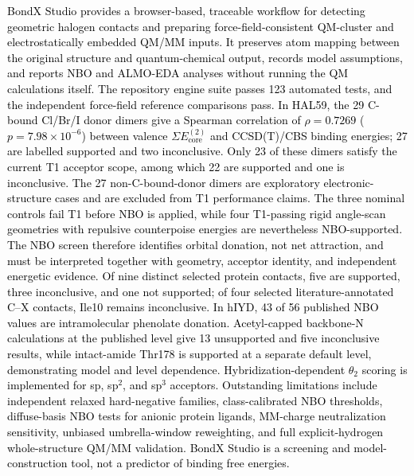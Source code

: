 \documentclass[journal=jcisd8,manuscript=article,layout=two-column]{achemso}
\newcommand{\tcb}[1]{{\textcolor{black}{#1}}}
\newcommand{\BX}{BondX Studio}
\begin{document}
\tcb{BondX Studio provides a browser-based, traceable workflow for detecting geometric halogen contacts and preparing force-field-consistent QM-cluster and electrostatically embedded QM/MM inputs. It preserves atom mapping between the original structure and quantum-chemical output, records model assumptions, and reports NBO and ALMO-EDA analyses without running the QM calculations itself. The repository engine suite passes 123 automated tests, and the independent force-field reference comparisons pass. In HAL59, the 29 C-bound Cl/Br/I donor dimers give a Spearman correlation of $\rho=0.7269$ ($p=7.98\times10^{-6}$) between valence $\Sigma E^{(2)}_{\mathrm{core}}$ and CCSD(T)/CBS binding energies; 27 are labelled supported and two inconclusive. Only 23 of these dimers satisfy the current T1 acceptor scope, among which 22 are supported and one is inconclusive. The 27 non-C-bound-donor dimers are exploratory electronic-structure cases and are excluded from T1 performance claims. The three nominal controls fail T1 before NBO is applied, while four T1-passing rigid angle-scan geometries with repulsive counterpoise energies are nevertheless NBO-supported. The NBO screen therefore identifies orbital donation, not net attraction, and must be interpreted together with geometry, acceptor identity, and independent energetic evidence. Of nine distinct selected protein contacts, five are supported, three inconclusive, and one not supported; of four selected literature-annotated C--X contacts, Ile10 remains inconclusive. In hIYD, 43 of 56 published NBO values are intramolecular phenolate donation. Acetyl-capped backbone-N calculations at the published level give 13 unsupported and five inconclusive results, while intact-amide Thr178 is supported at a separate default level, demonstrating model and level dependence. Hybridization-dependent $\theta_2$ scoring is implemented for sp, sp$^2$, and sp$^3$ acceptors. Outstanding limitations include independent relaxed hard-negative families, class-calibrated NBO thresholds, diffuse-basis NBO tests for anionic protein ligands, MM-charge neutralization sensitivity, unbiased umbrella-window reweighting, and full explicit-hydrogen whole-structure QM/MM validation. BondX Studio is a screening and model-construction tool, not a predictor of binding free energies.}


\end{document}

